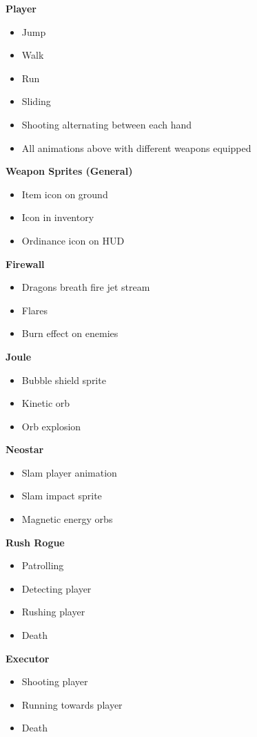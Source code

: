 \documentclass[../Main.tex]{subfiles}
\begin{document}
\textbf{Player}
\begin{itemize}
	\item Jump
	\item Walk
	\item Run
	\item Sliding
	\item Shooting alternating between each hand
	\item All animations above with different weapons equipped
\end{itemize}

\textbf{Weapon Sprites (General)}
\begin{itemize}
	\item Item icon on ground
	\item Icon in inventory
	\item Ordinance icon on HUD
\end{itemize}


\textbf{Firewall}
\begin{itemize}
	\item Dragons breath fire jet stream
\item Flares
\item Burn effect on enemies 
\end{itemize}

\textbf{Joule}
\begin{itemize}
	\item Bubble shield sprite
	\item Kinetic orb 
	\item Orb explosion
\end{itemize}

\textbf{Neostar}
\begin{itemize}
	\item Slam player animation
	\item Slam impact sprite
	\item Magnetic energy orbs
\end{itemize}

\textbf{Rush Rogue}
\begin{itemize}
	\item Patrolling
	\item Detecting player
	\item Rushing player
	\item Death
\end{itemize}

\textbf{Executor}
\begin{itemize}
	\item Shooting player
	\item Running towards player
	\item Death
\end{itemize}
\end{document}
